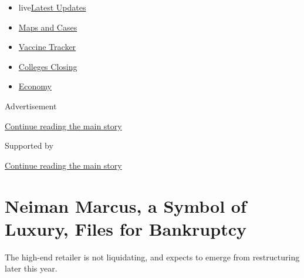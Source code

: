 \begin{itemize}
\tightlist
\item
  live\href{https://www.nytimes3xbfgragh.onion/2020/08/20/world/coronavirus-covid.html?name=styln-coronavirus-markets\&region=TOP_BANNER\&variant=undefined\&block=storyline_menu_recirc\&action=click\&pgtype=Article\&impression_id=85cc95a1-e38e-11ea-9e0e-81b7ab6c0278}{Latest
  Updates}
\item
  \href{https://www.nytimes3xbfgragh.onion/interactive/2020/us/coronavirus-us-cases.html?name=styln-coronavirus-markets\&region=TOP_BANNER\&variant=undefined\&block=storyline_menu_recirc\&action=click\&pgtype=Article\&impression_id=85cc95a2-e38e-11ea-9e0e-81b7ab6c0278}{Maps
  and Cases}
\item
  \href{https://www.nytimes3xbfgragh.onion/interactive/2020/science/coronavirus-vaccine-tracker.html?name=styln-coronavirus-markets\&region=TOP_BANNER\&variant=undefined\&block=storyline_menu_recirc\&action=click\&pgtype=Article\&impression_id=85cc95a3-e38e-11ea-9e0e-81b7ab6c0278}{Vaccine
  Tracker}
\item
  \href{https://www.nytimes3xbfgragh.onion/2020/08/19/us/colleges-closing-covid.html?name=styln-coronavirus-markets\&region=TOP_BANNER\&variant=undefined\&block=storyline_menu_recirc\&action=click\&pgtype=Article\&impression_id=85cc95a4-e38e-11ea-9e0e-81b7ab6c0278}{Colleges
  Closing}
\item
  \href{https://www.nytimes3xbfgragh.onion/live/2020/08/20/business/stock-market-today-coronavirus?name=styln-coronavirus-markets\&region=TOP_BANNER\&variant=undefined\&block=storyline_menu_recirc\&action=click\&pgtype=Article\&impression_id=85ccbcb0-e38e-11ea-9e0e-81b7ab6c0278}{Economy}
\end{itemize}

Advertisement

\protect\hyperlink{after-top}{Continue reading the main story}

Supported by

\protect\hyperlink{after-sponsor}{Continue reading the main story}

\hypertarget{neiman-marcus-a-symbol-of-luxury-files-for-bankruptcy}{%
\section{Neiman Marcus, a Symbol of Luxury, Files for
Bankruptcy}\label{neiman-marcus-a-symbol-of-luxury-files-for-bankruptcy}}

The high-end retailer is not liquidating, and expects to emerge from
restructuring later this year.

